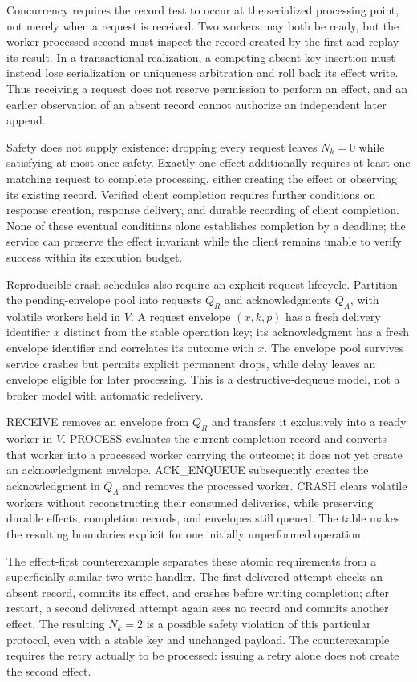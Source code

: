 \documentclass[11pt]{article}
\begin{document}
Concurrency requires the record test to occur at the serialized processing point, not merely when a request is received. Two workers may both be ready, but the worker processed second must inspect the record created by the first and replay its result. In a transactional realization, a competing absent-key insertion must instead lose serialization or uniqueness arbitration and roll back its effect write. Thus receiving a request does not reserve permission to perform an effect, and an earlier observation of an absent record cannot authorize an independent later append.

Safety does not supply existence: dropping every request leaves $N_k=0$ while satisfying at-most-once safety. Exactly one effect additionally requires at least one matching request to complete processing, either creating the effect or observing its existing record. Verified client completion requires further conditions on response creation, response delivery, and durable recording of client completion. None of these eventual conditions alone establishes completion by a deadline; the service can preserve the effect invariant while the client remains unable to verify success within its execution budget.

Reproducible crash schedules also require an explicit request lifecycle. Partition the pending-envelope pool into requests $Q_R$ and acknowledgments $Q_A$, with volatile workers held in $V$. A request envelope $(x,k,p)$ has a fresh delivery identifier $x$ distinct from the stable operation key; its acknowledgment has a fresh envelope identifier and correlates its outcome with $x$. The envelope pool survives service crashes but permits explicit permanent drops, while delay leaves an envelope eligible for later processing. This is a destructive-dequeue model, not a broker model with automatic redelivery.

RECEIVE removes an envelope from $Q_R$ and transfers it exclusively into a ready worker in $V$. PROCESS evaluates the current completion record and converts that worker into a processed worker carrying the outcome; it does not yet create an acknowledgment envelope. ACK\_\allowbreak{}ENQUEUE subsequently creates the acknowledgment in $Q_A$ and removes the processed worker. CRASH clears volatile workers without reconstructing their consumed deliveries, while preserving durable effects, completion records, and envelopes still queued. The table makes the resulting boundaries explicit for one initially unperformed operation.

The effect-first counterexample separates these atomic requirements from a superficially similar two-write handler. The first delivered attempt checks an absent record, commits its effect, and crashes before writing completion; after restart, a second delivered attempt again sees no record and commits another effect. The resulting $N_k=2$ is a possible safety violation of this particular protocol, even with a stable key and unchanged payload. The counterexample requires the retry actually to be processed: issuing a retry alone does not create the second effect.
\end{document}
